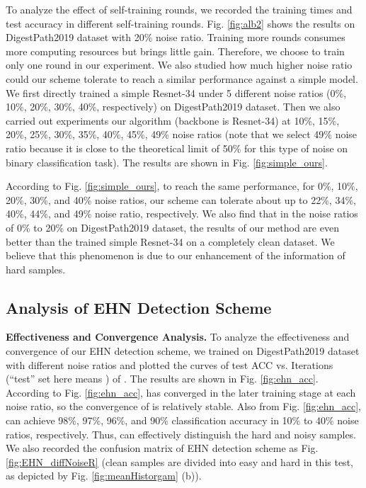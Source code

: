 {To analyze the effect of self-training rounds, we recorded the training times and test accuracy in different self-training rounds. Fig. \ref{fig:alb2} shows the results on DigestPath2019 dataset with 20\% noise ratio. Training more rounds consumes more computing resources but brings little gain. Therefore, we choose to train only one round in our experiment. We also studied how much higher noise ratio could our scheme tolerate to reach a similar performance against a simple model. We first directly trained a simple Resnet-34 under 5 different noise ratios (0\%, 10\%, 20\%, 30\%, 40\%, respectively) on DigestPath2019 dataset. Then we also carried out experiments }{our algorithm (backbone is Resnet-34) at 10\%, 15\%, 20\%, 25\%, 30\%, 35\%, 40\%, 45\%, 49\% noise ratios (note that we select 49\% noise ratio because it is close to the theoretical limit of 50\% for this type of noise on binary classification task). The results are shown in Fig. \ref{fig:simple_ours}.}

{According to Fig. \ref{fig:simple_ours}, to reach the same performance, for 0\%, 10\%, 20\%, 30\%, and 40\% noise ratios, our scheme can tolerate about up to 22\%, 34\%, 40\%, 44\%, and 49\% noise ratio, respectively. We also find that in the noise ratios of 0\% to 20\% on DigestPath2019 dataset, the results of our method are even better than the trained simple Resnet-34 on a completely clean dataset. We believe that this phenomenon is due to our enhancement of the information of hard samples.}


\subsection{Analysis of EHN Detection Scheme}

{\textbf{Effectiveness and Convergence Analysis.} To analyze the effectiveness and convergence of our EHN detection scheme, we trained on DigestPath2019 dataset with different noise ratios and plotted the curves of test ACC vs. Iterations (``test'' set here means ) of . The results are shown in Fig. \ref{fig:ehn_acc}. According to Fig. \ref{fig:ehn_acc},  has converged in the later training stage at each noise ratio, so the convergence of  is relatively stable. Also from Fig. \ref{fig:ehn_acc},  can achieve 98\%, 97\%, 96\%, and 90\% classification accuracy in 10\% to 40\% noise ratios, respectively. Thus,  can effectively distinguish the hard and noisy samples. We also recorded the confusion matrix of EHN detection scheme as Fig. \ref{fig:EHN_diffNoiseR} {(clean samples} {are divided into easy and hard in this test, as depicted by Fig. \ref{fig:meanHistorgam} (b)).}}

